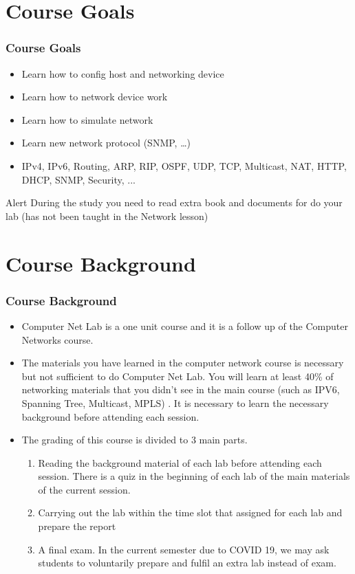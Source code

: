\documentclass[aspectratio=169,15pt]{beamer}
\begin{document}
\section{Course Goals}
\begin{frame}
    \frametitle{Course Goals}

    \begin{itemize}
        \item Learn how to config host and networking device
        \item Learn how to network device work
        \item Learn how to simulate network
        \item Learn new network protocol (SNMP, \dots)
        \item IPv4, IPv6, Routing, ARP, RIP, OSPF, UDP, TCP, Multicast, NAT, HTTP, DHCP, SNMP, Security, ...
    \end{itemize}
    \begin{alertblock}{Alert}
        During the study you need to read extra book and documents for do your lab (has not been taught in the Network lesson)
    \end{alertblock}

\end{frame}

\section{Course Background}
\begin{frame}
    \frametitle{Course Background}

    \begin{itemize}
        \item Computer Net Lab is a one unit course and it is a follow up of the Computer Networks course.
        \item The materials you have learned in the computer network course is necessary but not sufficient to do Computer Net Lab.
              You will learn at least 40\% of networking materials that you didn't see in the main course (such as IPV6, Spanning Tree, Multicast, MPLS) .
              It is necessary to learn the necessary background before attending each session.
        \item The grading of this course is divided to 3 main parts.
        \begin{enumerate}
            \item Reading the background material of each lab before attending each session.
                    There is a quiz in the beginning of each lab of the main materials of the current session.
            \item Carrying out the lab within the time slot that assigned for each lab and prepare the report
            \item A final exam.
                    In the current semester due to COVID 19, we may ask students to voluntarily prepare and fulfil an extra lab instead of exam.
        \end{enumerate}
    \end{itemize}

\end{frame}
\end{document}
